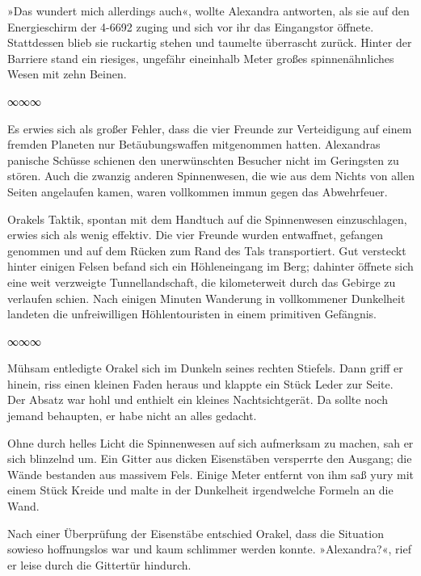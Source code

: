 »Das wundert mich allerdings auch«, wollte Alexandra antworten, als sie auf den Energieschirm der 4-6692 zuging und sich vor ihr das Eingangstor öffnete. Stattdessen blieb sie ruckartig stehen und taumelte überrascht zurück. Hinter der Barriere stand ein riesiges, ungefähr eineinhalb Meter großes spinnenähnliches Wesen mit zehn Beinen.

\begin{center}
    ∞∞∞
\end{center}

Es erwies sich als großer Fehler, dass die vier Freunde zur Verteidigung auf einem fremden Planeten nur Betäubungswaffen mitgenommen hatten. Alexandras panische Schüsse schienen den unerwünschten Besucher nicht im Geringsten zu stören. Auch die zwanzig anderen Spinnenwesen, die wie aus dem Nichts von allen Seiten angelaufen kamen, waren vollkommen immun gegen das Abwehrfeuer.

Orakels Taktik, spontan mit dem Handtuch auf die Spinnenwesen einzuschlagen, erwies sich als wenig effektiv. Die vier Freunde wurden entwaffnet, gefangen genommen und auf dem Rücken zum Rand des Tals transportiert. Gut versteckt hinter einigen Felsen befand sich ein Höhleneingang im Berg; dahinter öffnete sich eine weit verzweigte Tunnellandschaft, die kilometerweit durch das Gebirge zu verlaufen schien. Nach einigen Minuten Wanderung in vollkommener Dunkelheit landeten die unfreiwilligen Höhlentouristen in einem primitiven Gefängnis.

\begin{center}
    ∞∞∞
\end{center}

Mühsam entledigte Orakel sich im Dunkeln seines rechten Stiefels. Dann griff er hinein, riss einen kleinen Faden heraus und klappte ein Stück Leder zur Seite. Der Absatz war hohl und enthielt ein kleines Nachtsichtgerät. Da sollte noch jemand behaupten, er habe nicht an alles gedacht.

Ohne durch helles Licht die Spinnenwesen auf sich aufmerksam zu machen, sah er sich blinzelnd um. Ein Gitter aus dicken Eisenstäben versperrte den Ausgang; die Wände bestanden aus massivem Fels. Einige Meter entfernt von ihm saß yury mit einem Stück Kreide und malte in der Dunkelheit irgendwelche Formeln an die Wand.

Nach einer Überprüfung der Eisenstäbe entschied Orakel, dass die Situation sowieso hoffnungslos war und kaum schlimmer werden konnte. »Alexandra?«, rief er leise durch die Gittertür hindurch.

